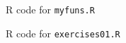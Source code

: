 \documentclass{article}
\newcommand{\rscript}[2]{
\begin{itemize}
\item[]
\end{itemize}
}
\begin{document}

\pagebreak
R code for \texttt{myfuns.R}

\pagebreak
R code for \texttt{exercises01.R}



\end{document}
